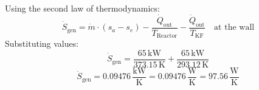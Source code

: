 Using the second law of thermodynamics:  
\[
\dot{S}_{\text{gen}} = \dot{m} \cdot (s_a - s_e) - \frac{\dot{Q}_{\text{out}}}{T_{\text{Reactor}}} - \frac{\dot{Q}_{\text{out}}}{T_{\text{KF}}} \quad \text{at the wall}
\]  
Substituting values:  
\[
\dot{S}_{\text{gen}} = \frac{65 \, \text{kW}}{373.15 \, \text{K}} + \frac{65 \, \text{kW}}{293.12 \, \text{K}}
\]  
\[
\dot{S}_{\text{gen}} = 0.09476 \, \frac{\text{kW}}{\text{K}} = 0.09476 \, \frac{\text{W}}{\text{K}} = 97.56 \, \frac{\text{W}}{\text{K}}
\]